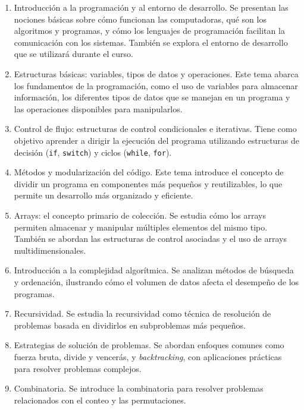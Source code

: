 \begin{enumerate}  
    \item Introducción a la programación y al entorno de desarrollo.  
    Se presentan las nociones básicas sobre cómo funcionan las computadoras, qué son los algoritmos y programas, y cómo los lenguajes de programación facilitan la comunicación con los sistemas. También se explora el entorno de desarrollo que se utilizará durante el curso.  

    \item Estructuras básicas: variables, tipos de datos y operaciones.
    Este tema abarca los fundamentos de la programación, como el uso de variables para almacenar información, los diferentes tipos de datos que se manejan en un programa y las operaciones disponibles para manipularlos.  

    \item Control de flujo: estructuras de control condicionales e iterativas. 
    Tiene como objetivo aprender a dirigir la ejecución del programa utilizando estructuras de decisión (\texttt{if}, \texttt{switch}) y ciclos (\texttt{while}, \texttt{for}).

    \item Métodos y modularización del código.
    Este tema introduce el concepto de dividir un programa en componentes más pequeños y reutilizables, lo que permite un desarrollo más organizado y eficiente.  

    \item Arrays: el concepto primario de colección.
    Se estudia cómo los arrays permiten almacenar y manipular múltiples elementos del mismo tipo. También se abordan las estructuras de control asociadas y el uso de arrays multidimensionales.

    \item Introducción a la complejidad algorítmica.
    Se analizan métodos de búsqueda y ordenación, ilustrando cómo el volumen de datos afecta el desempeño de los programas.  

    \item Recursividad.
    Se estudia la recursividad como técnica de resolución de problemas basada en dividirlos en subproblemas más pequeños.

    \item Estrategias de solución de problemas.
    Se abordan enfoques comunes como fuerza bruta, divide y vencerás, y \textit{backtracking}, con aplicaciones prácticas para resolver problemas complejos.  

    \item Combinatoria.
    Se introduce la combinatoria para resolver problemas relacionados con el conteo y las permutaciones. 


\end{enumerate}

